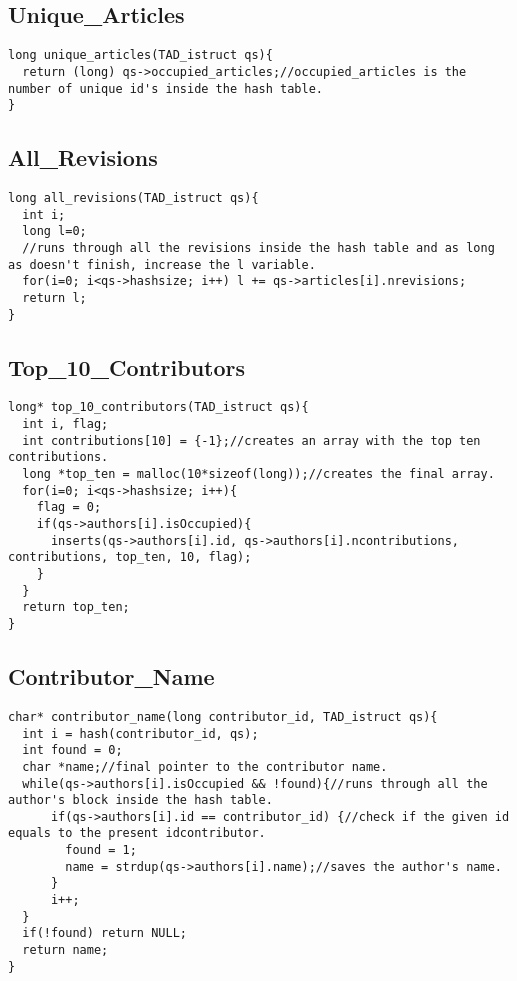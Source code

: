 \documentclass{article}
\begin{document}
\subsection{Unique\_Articles}  \label{Unique Articles}

\begin{lstlisting}
long unique_articles(TAD_istruct qs){
  return (long) qs->occupied_articles;//occupied_articles is the number of unique id's inside the hash table.
}
\end{lstlisting}

\subsection{All\_Revisions} \label{All Revisions}

\begin{lstlisting}
long all_revisions(TAD_istruct qs){
  int i;
  long l=0;
  //runs through all the revisions inside the hash table and as long as doesn't finish, increase the l variable.
  for(i=0; i<qs->hashsize; i++) l += qs->articles[i].nrevisions;
  return l;
}
\end{lstlisting}

\subsection{Top\_10\_Contributors} \label{Top10}

\begin{lstlisting}
long* top_10_contributors(TAD_istruct qs){
  int i, flag;
  int contributions[10] = {-1};//creates an array with the top ten contributions.
  long *top_ten = malloc(10*sizeof(long));//creates the final array.
  for(i=0; i<qs->hashsize; i++){
    flag = 0;
    if(qs->authors[i].isOccupied){
      inserts(qs->authors[i].id, qs->authors[i].ncontributions, contributions, top_ten, 10, flag);
    }
  }
  return top_ten;
}

\end{lstlisting}

\subsection{Contributor\_Name} \label{Contributor Name}

\begin{lstlisting}
char* contributor_name(long contributor_id, TAD_istruct qs){
  int i = hash(contributor_id, qs);
  int found = 0;
  char *name;//final pointer to the contributor name.
  while(qs->authors[i].isOccupied && !found){//runs through all the author's block inside the hash table.
      if(qs->authors[i].id == contributor_id) {//check if the given id equals to the present idcontributor.
        found = 1;
        name = strdup(qs->authors[i].name);//saves the author's name.
      }
      i++;
  }
  if(!found) return NULL;
  return name;
}
\end{lstlisting}
\end{document}
